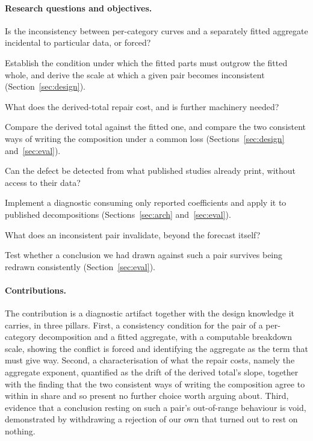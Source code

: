 \documentclass[11pt]{article}
\begin{document}
\paragraph{Research questions and objectives.}
\begin{description}[nosep,leftmargin=2.2em]
\item[RQ1] Is the inconsistency between per-category curves and a separately fitted
aggregate incidental to particular data, or forced?
\item[RO1] Establish the condition under which the fitted parts must outgrow the
fitted whole, and derive the scale at which a given pair becomes inconsistent
(Section~\ref{sec:design}).
\item[RQ2] What does the derived-total repair cost, and is further machinery needed?
\item[RO2] Compare the derived total against the fitted one, and compare the two
consistent ways of writing the composition under a common loss
(Sections~\ref{sec:design} and~\ref{sec:eval}).
\item[RQ3] Can the defect be detected from what published studies already print,
without access to their data?
\item[RO3] Implement a diagnostic consuming only reported coefficients and apply it
to published decompositions (Sections~\ref{sec:arch} and~\ref{sec:eval}).
\item[RQ4] What does an inconsistent pair invalidate, beyond the forecast itself?
\item[RO4] Test whether a conclusion we had drawn against such a pair survives being
redrawn consistently (Section~\ref{sec:eval}).
\end{description}

\paragraph{Contributions.}
The contribution is a diagnostic artifact together with the design knowledge it
carries, in three pillars. First, a consistency condition for the pair of a
per-category decomposition and a fitted aggregate, with a computable breakdown
scale, showing the conflict is forced and identifying the aggregate as the term that
must give way. Second, a characterisation of what the repair costs, namely the
aggregate exponent, quantified as the drift of the derived total's slope, together
with the finding that the two consistent ways of writing the composition agree to
within  in share and so present no further choice worth
arguing about. Third, evidence that a conclusion resting on such a pair's
out-of-range behaviour is void, demonstrated by withdrawing a rejection of our own
that turned out to rest on nothing.
\end{document}
